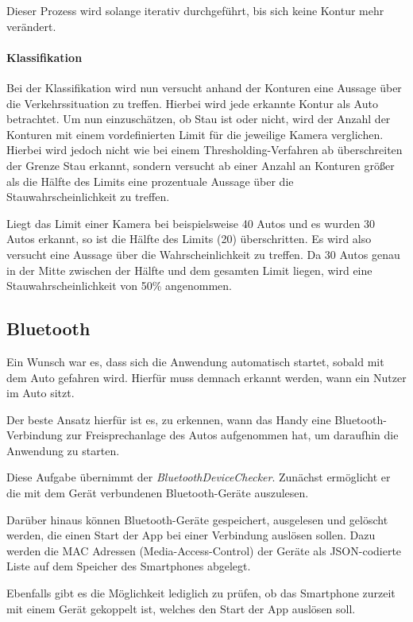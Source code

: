Dieser Prozess wird solange iterativ durchgeführt, bis sich keine Kontur mehr verändert.

\paragraph*{Klassifikation}
Bei der Klassifikation wird nun versucht anhand der Konturen eine Aussage über die Verkehrssituation zu treffen.
Hierbei wird jede erkannte Kontur als Auto betrachtet.
Um nun einzuschätzen, ob Stau ist oder nicht, wird der Anzahl der Konturen mit einem vordefinierten Limit für die jeweilige Kamera verglichen. Hierbei wird jedoch nicht wie bei einem Thresholding-Verfahren ab überschreiten der Grenze Stau erkannt, sondern versucht ab einer Anzahl an Konturen größer als die Hälfte des Limits eine prozentuale Aussage über die Stauwahrscheinlichkeit zu treffen.

Liegt das Limit einer Kamera bei beispielsweise 40 Autos und es wurden 30 Autos erkannt, so ist die Hälfte des Limits (20) überschritten. Es wird also versucht eine Aussage über die Wahrscheinlichkeit zu treffen. Da 30 Autos genau in der Mitte zwischen der Hälfte und dem gesamten Limit liegen, wird eine Stauwahrscheinlichkeit von 50\% angenommen.

\subsection{Bluetooth}
Ein Wunsch war es, dass sich die Anwendung automatisch startet, sobald mit dem Auto gefahren wird.
Hierfür muss demnach erkannt werden, wann ein Nutzer im Auto sitzt.

Der beste Ansatz hierfür ist es, zu erkennen, wann das Handy eine Bluetooth-Verbindung zur Freisprechanlage des Autos aufgenommen hat, um daraufhin die Anwendung zu starten.

Diese Aufgabe übernimmt der {\em BluetoothDeviceChecker}. Zunächst ermöglicht er die mit dem Gerät verbundenen Bluetooth-Geräte auszulesen.

Darüber hinaus können Bluetooth-Geräte gespeichert, ausgelesen und gelöscht werden, die einen Start der App bei einer Verbindung auslösen sollen.
Dazu werden die MAC Adressen (Media-Access-Control) der Geräte als JSON-codierte Liste auf dem Speicher des Smartphones abgelegt.

Ebenfalls gibt es die Möglichkeit lediglich zu prüfen, ob das Smartphone zurzeit mit einem Gerät gekoppelt ist, welches den Start der App auslösen soll.

